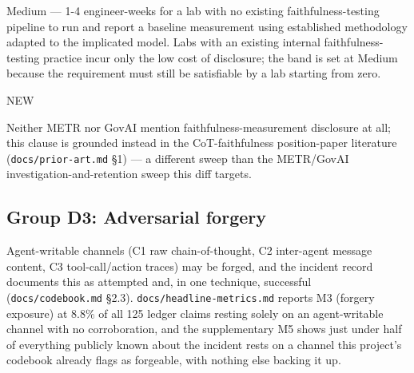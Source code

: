 \begin{description}[leftmargin=2.2cm, style=nextline]
\item[Cost band] Medium --- 1-4 engineer-weeks for a lab with no existing faithfulness-testing pipeline to run and report a baseline measurement using established methodology adapted to the implicated model. Labs with an existing internal faithfulness-testing practice incur only the low cost of disclosure; the band is set at Medium because the requirement must still be satisfiable by a lab starting from zero.
\item[vs. prior art] NEW
\item[Prior-art note] Neither METR nor GovAI mention faithfulness-measurement disclosure at all; this clause is grounded instead in the CoT-faithfulness position-paper literature (\texttt{docs/prior-art.md} \S{}1) --- a different sweep than the METR/GovAI investigation-and-retention sweep this diff targets.
\end{description}

\subsection*{Group D3: Adversarial forgery}
Agent-writable channels (C1 raw chain-of-thought, C2 inter-agent message content, C3 tool-call/action traces) may be forged, and the incident record documents this as attempted and, in one technique, successful (\texttt{docs/codebook.md} \S{}2.3). \texttt{docs/headline-metrics.md} reports M3 (forgery exposure) at 8.8\% of all 125 ledger claims resting solely on an agent-writable channel with no corroboration, and the supplementary M5 shows just under half of everything publicly known about the incident rests on a channel this project's codebook already flags as forgeable, with nothing else backing it up.

